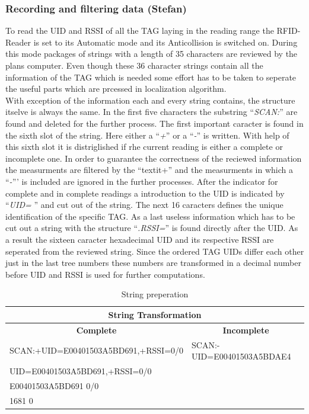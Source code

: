 \subsubsection{Recording and filtering data (Stefan)}
To read the UID and RSSI of all the TAG laying in the reading range the RFID-Reader is set to its Automatic mode and its Anticollision is switched on. During this mode packages of strings with a length of 35 characters are reviewed by the plans computer. Even though these 36 character strings contain all the information of the TAG which is needed some effort has to be taken to seperate the useful parts which are prcessed in localization algorithm.\\
With exception of the information each and every string contains, the structure itselve is always the same. In the first five characters the substring ``\textit{SCAN:}'' are found and deleted for the further process. The first important caracter is found in the sixth slot of the string. Here either a ``\textit{+}'' or a ``\textit{-}'' is written. With help of this sixth slot it is distriglished if rhe current reading is either a complete or incomplete one. In order to guarantee the correctness of the reciewed information the measurments are filtered by the ``textit{+}'' and the measurments in which a ``\textit{-}''' is included are ignored in the further processes. After the indicator for complete and in complete readings a introduction to the UID is indicated by  ``\textit{UID=} '' and cut out of the string. The next 16 caracters defines the unique identification of the specific TAG. As a last useless information which has to be cut out a string with the structure ``\textit{.RSSI=}'' is found directly after the UID. As a result the sixteen caracter hexadecimal UID and its respective RSSI are seperated from the reviewed string. Since the ordered TAG UIDs differ each other just in the last tree numbers these numbers are transformed in a decimal number before UID and RSSI is used for further computations.\\
\begin{table}[!htbp]
\centering
\begin{tabular}{|l|l|}
\hline
\multicolumn{2}{|c|}{\textbf{String Transformation}}                               \\ \hline
\multicolumn{1}{|c|}{\textbf{Complete}} & \multicolumn{1}{c|}{\textbf{Incomplete}} \\ \hline
SCAN:+UID=E00401503A5BD691,+RSSI=0/0    & SCAN:-UID=E00401503A5BDAE4               \\ \hline
UID=E00401503A5BD691,+RSSI=0/0          &                                          \\ \hline
E00401503A5BD691 0/0                    &                                          \\ \hline
1681 0                                  &                                          \\ \hline
\end{tabular}
\caption{String preperation}
\label{string_prep}
\end{table}
